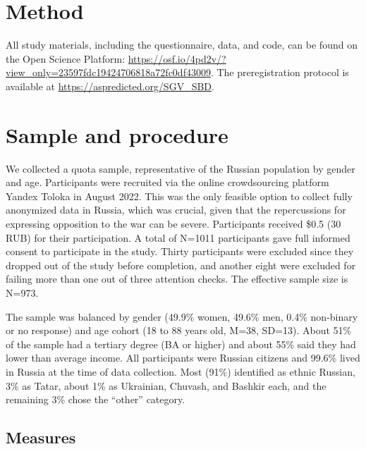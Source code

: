 \documentclass[
]{article}
\begin{document}
\allsectionsfont{\centering}

\hypertarget{method}{%
\section*{Method}\label{method}}

All study materials, including the questionnaire, data, and code, can be found on the Open Science Platform: \url{https://osf.io/4pd2v/?view_only=23597fdc19424706818a72fc0df43009}. The preregistration protocol is available at \url{https://aspredicted.org/SGV_SBD}.

\allsectionsfont{\raggedright}

\hypertarget{sample-and-procedure}{%
\section*{Sample and procedure}\label{sample-and-procedure}}

We collected a quota sample, representative of the Russian population by gender and age. Participants were recruited via the online crowdsourcing platform Yandex Toloka in August 2022. This was the only feasible option to collect fully anonymized data in Russia, which was crucial, given that the repercussions for expressing opposition to the war can be severe. Participants received \$0.5 (30 RUB) for their participation. A total of N=1011 participants gave full informed consent to participate in the study. Thirty participants were excluded since they dropped out of the study before completion, and another eight were excluded for failing more than one out of three attention checks. The effective sample size is N=973.

The sample was balanced by gender (49.9\% women, 49.6\% men, 0.4\% non-binary or no response) and age cohort (18 to 88 years old, M=38, SD=13). About 51\% of the sample had a tertiary degree (BA or higher) and about 55\% said they had lower than average income. All participants were Russian citizens and 99.6\% lived in Russia at the time of data collection. Most (91\%) identified as ethnic Russian, 3\% as Tatar, about 1\% as Ukrainian, Chuvash, and Bashkir each, and the remaining 3\% chose the ``other'' category.

\hypertarget{measures}{%
\subsection*{Measures}\label{measures}}
\end{document}
